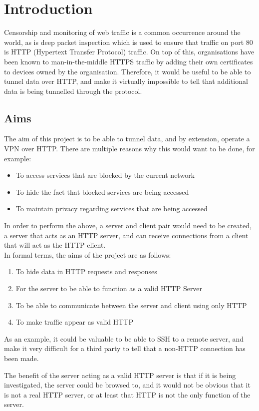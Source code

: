 \section{Introduction}
Censorship and monitoring of web traffic is a common occurrence around the world, as is deep packet inspection which is used to ensure that traffic on port 80 is HTTP (Hypertext Transfer Protocol) traffic.
On top of this, organisations have been known to man-in-the-middle HTTPS traffic by adding their own certificates to devices owned by the organisation.
Therefore, it would be useful to be able to tunnel data over HTTP, and make it virtually impossible to tell that additional data is being tunnelled through the protocol.

\subsection{Aims}
The aim of this project is to be able to tunnel data, and by extension, operate a VPN over HTTP\@. There are multiple reasons why this would want to be done, for example:
\begin{itemize}
    \item To access services that are blocked by the current network
    \item To hide the fact that blocked services are being accessed
    \item To maintain privacy regarding services that are being accessed
\end{itemize}
In order to perform the above, a server and client pair would need to be created, a server that acts as an HTTP server, and can receive connections from a client that will act as the HTTP client.\\
In formal terms, the aims of the project are as follows:
\begin{enumerate}
    \item To hide data in HTTP requests and responses
    \item For the server to be able to function as a valid HTTP Server
    \item To be able to communicate between the server and client using only HTTP
    \item To make traffic appear as valid HTTP
\end{enumerate}
As an example, it could be valuable to be able to SSH to a remote server, and make it very difficult for a third party to tell that a non-HTTP connection has been made.\par
The benefit of the server acting as a valid HTTP server is that if it is being investigated, the server could be browsed to, and it would not be obvious that it is not a real HTTP server, or at least that HTTP is not the only function of the server.

